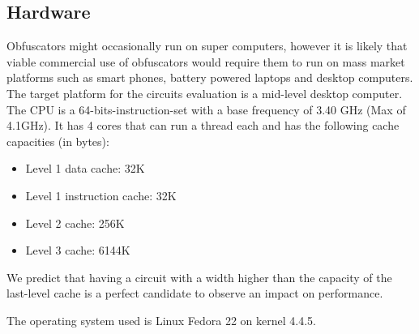 \subsection{Hardware}
Obfuscators might occasionally run on super computers, however it is likely that
viable commercial use of obfuscators would require them to run on mass market
platforms such as smart phones, battery powered laptops and desktop computers\cite{clark}.
The target platform for the circuits evaluation is a mid-level desktop computer.
The CPU is a 64-bits-instruction-set with a base frequency of 3.40 GHz (Max of 4.1GHz).
It has 4 cores that can run a thread each and has the following cache capacities (in bytes):
\begin{itemize}[noitemsep]
\item Level 1 data cache: 32K
\item Level 1 instruction cache: 32K
\item Level 2 cache: 256K
\item Level 3 cache: 6144K
\end{itemize}
We predict that having a circuit with a width higher than the capacity of the
last-level cache is a perfect candidate to observe an impact on performance.
\par
The operating system used is Linux Fedora 22 on kernel 4.4.5.


